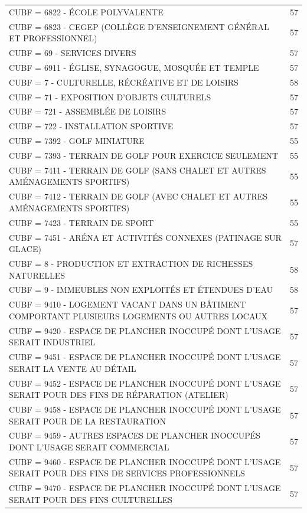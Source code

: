 {\begin{longtable}{p{13cm}r}
                CUBF = 6822 - ÉCOLE POLYVALENTE & 57 \\
                CUBF = 6823 - CEGEP (COLLÈGE D'ENSEIGNEMENT GÉNÉRAL ET PROFESSIONNEL) & 57 \\
                CUBF = 69 - SERVICES DIVERS & 57 \\
                CUBF = 6911 - ÉGLISE, SYNAGOGUE, MOSQUÉE ET TEMPLE & 57 \\
                CUBF = 7 - CULTURELLE, RÉCRÉATIVE ET DE LOISIRS & 58 \\
                CUBF = 71 - EXPOSITION D'OBJETS CULTURELS & 57 \\
                CUBF = 721 - ASSEMBLÉE DE LOISIRS & 57 \\
                CUBF = 722 - INSTALLATION SPORTIVE & 57 \\
                CUBF = 7392 - GOLF MINIATURE & 55 \\
                CUBF = 7393 - TERRAIN DE GOLF POUR EXERCICE SEULEMENT & 55 \\
                CUBF = 7411 - TERRAIN DE GOLF (SANS CHALET ET AUTRES AMÉNAGEMENTS SPORTIFS) & 55 \\
                CUBF = 7412 - TERRAIN DE GOLF (AVEC CHALET ET AUTRES AMÉNAGEMENTS SPORTIFS) & 55 \\
                CUBF = 7423 - TERRAIN DE SPORT & 55 \\
                CUBF = 7451 - ARÉNA ET ACTIVITÉS CONNEXES (PATINAGE SUR GLACE) & 57 \\
                CUBF = 8 - PRODUCTION ET EXTRACTION DE RICHESSES NATURELLES & 58 \\
                CUBF = 9 - IMMEUBLES NON EXPLOITÉS ET ÉTENDUES D'EAU & 58 \\
                CUBF = 9410 - LOGEMENT VACANT DANS UN BÂTIMENT COMPORTANT PLUSIEURS LOGEMENTS OU AUTRES LOCAUX & 57 \\
                CUBF = 9420 - ESPACE DE PLANCHER INOCCUPÉ DONT L'USAGE SERAIT INDUSTRIEL & 57 \\
                CUBF = 9451 - ESPACE DE PLANCHER INOCCUPÉ DONT L'USAGE SERAIT LA VENTE AU DÉTAIL & 57 \\
                CUBF = 9452 - ESPACE DE PLANCHER INOCCUPÉ DONT L'USAGE SERAIT POUR DES FINS DE RÉPARATION (ATELIER) & 57 \\
                CUBF = 9458 - ESPACE DE PLANCHER INOCCUPÉ DONT L'USAGE SERAIT POUR DE LA RESTAURATION & 57 \\
                CUBF = 9459 - AUTRES ESPACES DE PLANCHER INOCCUPÉS DONT L'USAGE SERAIT COMMERCIAL & 57 \\
                CUBF = 9460 - ESPACE DE PLANCHER INOCCUPÉ DONT L'USAGE SERAIT POUR DES FINS DE SERVICES PROFESSIONNELS & 57 \\
                CUBF = 9470 - ESPACE DE PLANCHER INOCCUPÉ DONT L'USAGE SERAIT POUR DES FINS CULTURELLES & 57 \\
            \end{longtable}}
